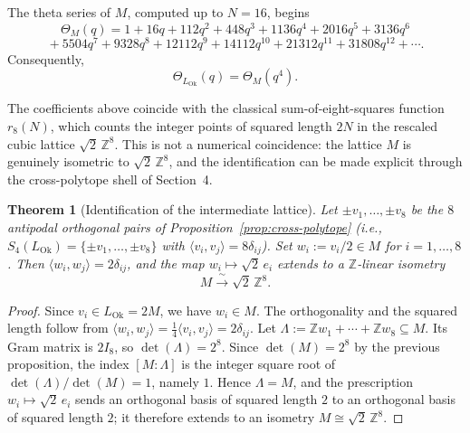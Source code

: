 \documentclass{birkjour}
\newtheorem{theorem}{Theorem}[section]
\newcommand{\LOk}{L_{\mathrm{Ok}}}
\newcommand{\ZZ}{\mathbb Z}
\numberwithin{equation}{section}
\begin{document}
The theta series of \(M\), computed up to \(N=16\), begins
\begin{equation}
\Theta_M(q)=
1+16q+112q^2+448q^3+1136q^4+2016q^5+3136q^6
\end{equation}
\begin{equation}
{}+5504q^7+9328q^8+12112q^9+14112q^{10}
+21312q^{11}+31808q^{12}+\cdots .
\end{equation}
Consequently,
\begin{equation}
\Theta_{\LOk}(q)=\Theta_M(q^4).
\end{equation}

The coefficients above coincide with the classical sum-of-eight-squares
function \(r_8(N)\), which counts the integer points of squared length \(2N\)
in the rescaled cubic lattice \(\sqrt2\,\ZZ^8\). This is not a numerical
coincidence: the lattice \(M\) is genuinely isometric to \(\sqrt2\,\ZZ^8\), and
the identification can be made explicit through the cross-polytope shell of
Section~4.

\begin{theorem}[Identification of the intermediate lattice]
\label{thm:M-cubic}
Let \(\pm v_1,\ldots,\pm v_8\) be the \(8\) antipodal orthogonal pairs of
Proposition~\ref{prop:cross-polytope} (i.e.,
\(S_4(\LOk)=\{\pm v_1,\ldots,\pm v_8\}\) with
\(\langle v_i,v_j\rangle=8\delta_{ij}\)). Set
\(w_i:=v_i/2\in M\) for \(i=1,\ldots,8\). Then
\(\langle w_i,w_j\rangle=2\delta_{ij}\), and the map \(w_i\mapsto\sqrt2\,e_i\)
extends to a \(\ZZ\)-linear isometry
\begin{equation}
\label{eq:M-isometry}
M\xrightarrow{\;\sim\;}\sqrt2\,\ZZ^8.
\end{equation}
\end{theorem}

\begin{proof}
Since \(v_i\in\LOk=2M\), we have \(w_i\in M\). The orthogonality and the
squared length follow from
\(\langle w_i,w_j\rangle=\tfrac14\langle v_i,v_j\rangle=2\delta_{ij}\).
Let \(\Lambda:=\ZZ w_1+\cdots+\ZZ w_8\subseteq M\). Its Gram matrix is \(2I_8\),
so \(\det(\Lambda)=2^8\). Since \(\det(M)=2^8\) by the previous proposition,
the index \([M:\Lambda]\) is the integer square root of
\(\det(\Lambda)/\det(M)=1\), namely \(1\). Hence \(\Lambda=M\), and the
prescription \(w_i\mapsto\sqrt2\,e_i\) sends an orthogonal basis of squared
length \(2\) to an orthogonal basis of squared length \(2\); it therefore
extends to an isometry \(M\cong\sqrt2\,\ZZ^8\).
\end{proof}
\end{document}
